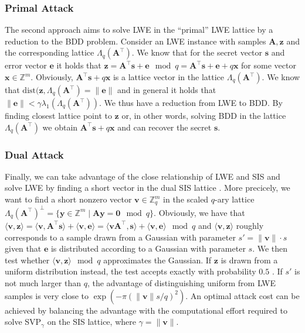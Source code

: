 \subsubsection{Primal Attack}\label{sec:primal-attacks}
The second approach aims to solve LWE in the ``primal'' LWE lattice by a reduction to the BDD problem. Consider an LWE instance with samples $\mathbf{A}, \mathbf{z}$ and the corresponding lattice $\Lambda_q(\mathbf{A}^\intercal)$. We know that for the secret vector $\mathbf{s}$ and error vector $\mathbf{e}$ it holds that $\mathbf{z} = \mathbf{A}^\intercal \mathbf{s} + \mathbf{e} \mod q = \mathbf{A}^\intercal \mathbf{s} + \mathbf{e} + q \mathbf{x}$ for some vector $\mathbf{x} \in \mathbb{Z}^m$. Obviously, $\mathbf{A}^\intercal \mathbf{s} + q \mathbf{x}$ is a lattice vector in the lattice $\Lambda_q(\mathbf{A}^\intercal)$. We know that $\text{dist}(\mathbf{z}, \Lambda_q(\mathbf{A}^\intercal) = \|\mathbf{e}\|$ and in general it holds that $\|\mathbf{e}\| < \gamma \lambda_1(\Lambda_q(\mathbf{A}^\intercal))$. We thus have a reduction from LWE to BDD. By finding closest lattice point to $\mathbf{z}$ or, in other words, solving BDD in the lattice $\Lambda_q(\mathbf{A}^\intercal)$ we obtain $\mathbf{A}^\intercal \mathbf{s} + q \mathbf{x}$  and can recover the secret $\mathbf{s}$.

\subsubsection{Dual Attack}\label{sec:dual-attacks}
Finally, we can take advantage of the close relationship of LWE and SIS and solve LWE by finding a short vector in the dual SIS lattice \cite{LP11}. More precicely, we want to find a short nonzero vector $\mathbf{v}\in \mathbb{Z}_q^{m}$ in the scaled $q$-ary lattice $\Lambda_q(\mathbf{A}^\intercal)^{\perp} = \{ \mathbf{y} \in \mathbb{Z}^m \mid \mathbf{A} \mathbf{y} = \mathbf{0} \mod q\}$. Obviously, we have that $\langle \mathbf{v}, \mathbf{z} \rangle = \langle \mathbf{v}, \mathbf{A}^\intercal \mathbf{s} \rangle + \langle \mathbf{v}, \mathbf{e}\rangle = \langle \mathbf{v}\mathbf{A}^\intercal,  \mathbf{s} \rangle + \langle \mathbf{v}, \mathbf{e} \rangle \mod q$ and $\langle \mathbf{v}, \mathbf{z} \rangle$ roughly corresponds to a sample drawn from a Gaussian with parameter $s' = \|\mathbf{v}\| \cdot s$ given that $\mathbf{e}$ is distributed according to a Gaussian with parameter $s$. We then test whether $\langle \mathbf{v}, \mathbf{z} \rangle \mod q$ approximates the Gaussian. If $\mathbf{z}$ is drawn from a uniform distribution instead, the test accepts exactly with probability $0.5$ \cite{LP11}. If $s'$ is not much larger than $q$, the advantage of distinguishing uniform from LWE samples is very close to $\exp(-\pi (\| \mathbf{v} \| s/q)^2)$. An optimal attack cost can be achieved by balancing the advantage with the computational effort required to solve SVP$_\gamma$ on the SIS lattice, where $\gamma = \|\mathbf{v}\|$.

